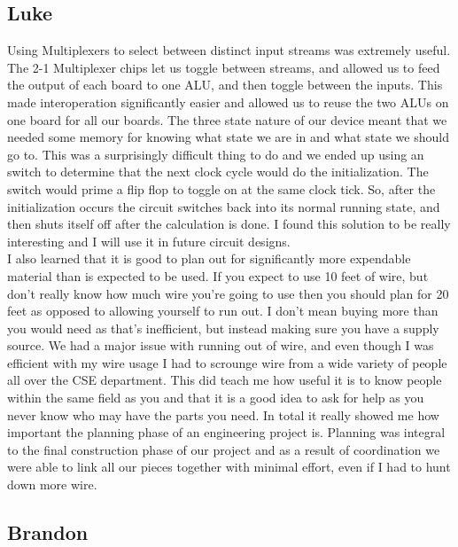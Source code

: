 \subsection{Luke}
Using Multiplexers to select between distinct input streams was extremely useful. The 2-1 Multiplexer chips let us toggle between streams, and allowed us to feed the output of each board to one ALU, and then toggle between the inputs. This made interoperation significantly easier and allowed us to reuse the two ALUs on one board for all our boards. The three state nature of our device meant that we needed some memory for knowing what state we are in and what state we should go to. This was a surprisingly difficult thing to do and we ended up using an switch to determine that the next clock cycle would do the initialization. The switch would prime a flip flop to toggle on at the same clock tick. So, after the initialization occurs the circuit switches back into its normal running state, and then shuts itself off after the calculation is done. I found this solution to be really interesting and I will use it in future circuit designs.\\


I also learned that it is good to plan out for significantly more expendable material than is expected to be used. If you expect to use 10 feet of wire, but don't really know how much wire you're going to use then you should plan for 20 feet as opposed to allowing yourself to run out. I don't mean buying more than you would need as that's inefficient, but instead making sure you have a supply source. We had a major issue with running out of wire, and even though I was efficient with my wire usage I had to scrounge wire from a wide variety of people all over the CSE department. This did teach me how useful it is to know people within the same field as you and that it is a good idea to ask for help as you never know who may have the parts you need. In total it really showed me how important the planning phase of an engineering project is. Planning was integral to the final construction phase of our project and as a result of coordination we were able to link all our pieces together with minimal effort, even if I had to hunt down more wire.\\

 
\subsection{Brandon}
